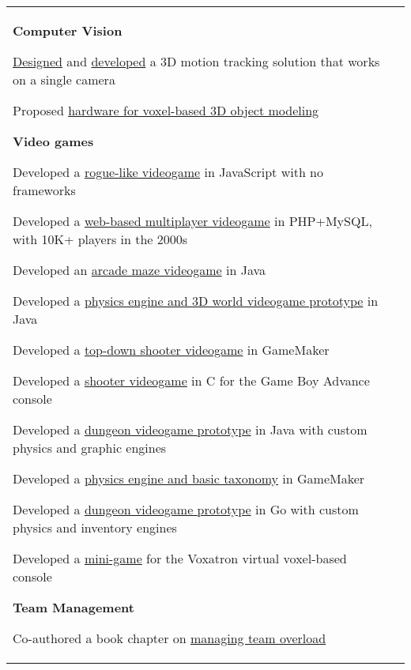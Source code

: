 \documentclass[letterpaper,10pt,oneside]{article}
\newcommand{\itemspacingtwo}{\vspace{0.08cm}}
\newenvironment{body}
{\par\par
\begin{longtable}{p{0.145\textwidth}p{0.81\textwidth}}}
{\par\end{longtable}\par}
\begin{document}
\begin{body}
\textbf{Computer Vision}
\begin{comp}
\item \href{https://www.worldscientific.com/doi/abs/10.1142/S0129065712500190}{Designed} and \href{https://github.com/lquesada/MotionTracking}{developed} a 3D motion tracking solution that works on a single camera
\item Proposed \href{https://www.tdcommons.org/dpubs_series/4167/}{hardware for voxel-based 3D object modeling}
\end{comp}
\itemspacingtwo

\textbf{Video games}
\begin{comp}
\item Developed a \href{https://cavernal.github.io/cavernal}{rogue-like videogame} in JavaScript with no frameworks
\item Developed a \href{https://github.com/lquesada/LifoSource}{web-based multiplayer videogame} in PHP+MySQL, with 10K+ players in the 2000s
\item Developed an \href{https://github.com/lquesada/Cocoman}{arcade maze videogame} in Java
\item Developed a \href{https://github.com/lquesada/MineWorld}{physics engine and 3D world videogame prototype} in Java
\item Developed a \href{https://github.com/lquesada/AlienZeed}{top-down shooter videogame} in GameMaker
\item Developed a \href{https://github.com/lquesada/SpaceARMy}{shooter videogame} in C for the Game Boy Advance console
\item Developed a \href{https://github.com/lquesada/RogueCave}{dungeon videogame prototype} in Java with custom physics and graphic engines
\item Developed a \href{https://github.com/lquesada/PhysicsEngine}{physics engine and basic taxonomy} in GameMaker
\item Developed a \href{https://github.com/lquesada/CaveExplorer}{dungeon videogame prototype} in Go with custom physics and inventory engines
\item Developed a \href{https://github.com/lquesada/PiticliSim}{mini-game} for the Voxatron virtual voxel-based console
\end{comp}
\itemspacingtwo

\textbf{Team Management}
\begin{comp}
\item Co-authored a book chapter on \href{https://landing.google.com/sre/workbook/chapters/overload/}{managing team overload}
\end{comp}
\itemspacingtwo


\end{body}
\end{document}
